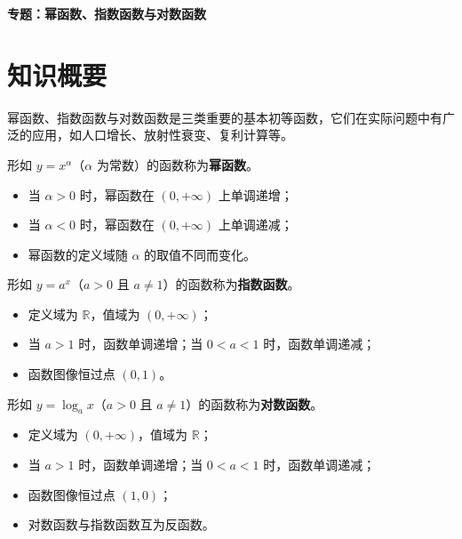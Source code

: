 \documentclass[11pt]{ctexrep}
\begin{document}
\begin{center}
    {\LARGE\bfseries 专题：幂函数、指数函数与对数函数}
\end{center}

\section*{知识概要}

幂函数、指数函数与对数函数是三类重要的基本初等函数，它们在实际问题中有广泛的应用，如人口增长、放射性衰变、复利计算等。

\begin{definition}[幂函数]
    形如 $y = x^\alpha$（$\alpha$ 为常数）的函数称为\textbf{幂函数}。
    \begin{itemize}
        \item 当 $\alpha > 0$ 时，幂函数在 $(0, +\infty)$ 上单调递增；
        \item 当 $\alpha < 0$ 时，幂函数在 $(0, +\infty)$ 上单调递减；
        \item 幂函数的定义域随 $\alpha$ 的取值不同而变化。
    \end{itemize}
\end{definition}

\begin{definition}[指数函数]
    形如 $y = a^x$（$a > 0$ 且 $a \neq 1$）的函数称为\textbf{指数函数}。
    \begin{itemize}
        \item 定义域为 $\mathbb{R}$，值域为 $(0, +\infty)$；
        \item 当 $a > 1$ 时，函数单调递增；当 $0 < a < 1$ 时，函数单调递减；
        \item 函数图像恒过点 $(0, 1)$。
    \end{itemize}
\end{definition}

\begin{definition}[对数函数]
    形如 $y = \log_a x$（$a > 0$ 且 $a \neq 1$）的函数称为\textbf{对数函数}。
    \begin{itemize}
        \item 定义域为 $(0, +\infty)$，值域为 $\mathbb{R}$；
        \item 当 $a > 1$ 时，函数单调递增；当 $0 < a < 1$ 时，函数单调递减；
        \item 函数图像恒过点 $(1, 0)$；
        \item 对数函数与指数函数互为反函数。
    \end{itemize}
\end{definition}
\end{document}
